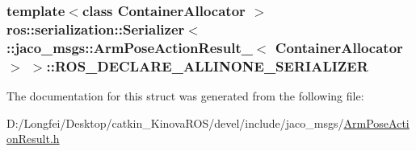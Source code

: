 \subsubsection[{\texorpdfstring{R\+O\+S\+\_\+\+D\+E\+C\+L\+A\+R\+E\+\_\+\+A\+L\+L\+I\+N\+O\+N\+E\+\_\+\+S\+E\+R\+I\+A\+L\+I\+Z\+ER}{ROS_DECLARE_ALLINONE_SERIALIZER}}]{\setlength{\rightskip}{0pt plus 5cm}template$<$class Container\+Allocator $>$ ros\+::serialization\+::\+Serializer$<$ \+::{\bf jaco\+\_\+msgs\+::\+Arm\+Pose\+Action\+Result\+\_\+}$<$ Container\+Allocator $>$ $>$\+::R\+O\+S\+\_\+\+D\+E\+C\+L\+A\+R\+E\+\_\+\+A\+L\+L\+I\+N\+O\+N\+E\+\_\+\+S\+E\+R\+I\+A\+L\+I\+Z\+ER}\hypertarget{structros_1_1serialization_1_1Serializer_3_01_1_1jaco__msgs_1_1ArmPoseActionResult___3_01ContainerAllocator_01_4_01_4_a91c7ac95e69983159bfd0ee0eb84a891}{}\label{structros_1_1serialization_1_1Serializer_3_01_1_1jaco__msgs_1_1ArmPoseActionResult___3_01ContainerAllocator_01_4_01_4_a91c7ac95e69983159bfd0ee0eb84a891}


The documentation for this struct was generated from the following file\+:\begin{DoxyCompactItemize}
\item 
D\+:/\+Longfei/\+Desktop/catkin\+\_\+\+Kinova\+R\+O\+S/devel/include/jaco\+\_\+msgs/\hyperlink{ArmPoseActionResult_8h}{Arm\+Pose\+Action\+Result.\+h}\end{DoxyCompactItemize}
